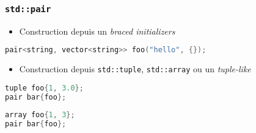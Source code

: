 \documentclass[C++.tex]{subfiles}
\begin{document}
\begin{frame}[fragile]
	\frametitle{\lstinline|std::pair|}
	\begin{itemize}
		\item Construction depuis un \textit{braced initializers}

	\end{itemize}

	\begin{lstlisting}[language=C++]
pair<string, vector<string>> foo("hello", {});\end{lstlisting}

	\begin{itemize}
		\item Construction depuis \lstinline|std::tuple|, \lstinline|std::array| ou un \textit{tuple-like}
	\end{itemize}

	\begin{lstlisting}[language=C++]
tuple foo{1, 3.0};
pair bar{foo};\end{lstlisting}

	\begin{lstlisting}[language=C++]
array foo{1, 3};
pair bar{foo};\end{lstlisting}
\end{frame}
\end{document}
